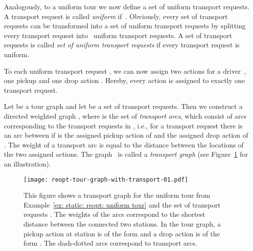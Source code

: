 \documentclass[english]{llncs}
\numberwithin{sublemma}{lemma}
\begin{document}
Analogously, to a uniform tour we now define a set of uniform transport requests.
A transport request  is called \emph{uniform} if~.
Obviously, every set of transport requests can be transformed into a set of uniform transport requests by splitting every transport request  into~ uniform transport requests.
A set of transport requests  is called \emph{set of uniform transport requests} if every transport request  is uniform.


To each uniform transport request , we can now assign two actions for a driver~, one pickup  and one drop action .
Hereby, every action is assigned to exactly one transport request.

Let  be a tour graph and let  be a set of transport requests.
Then we construct a directed weighted graph , where
 is the set of \emph{transport arcs}, which consist of arcs corresponding to the transport requests in ,
i.e., for a transport request  there is an arc between  if  is the assigned pickup action of  and  the assigned drop action of .
The weight of a transport arc is equal to the distance between the locations of the two assigned actions.
The graph~ is called a \emph{transport graph} (see Figure~\ref{fig: static: reopt: transport graph} for an illustration).


\begin{figure}[ht]
    \centering
    \texttt{[image: reopt-tour-graph-with-transport-01.pdf]}
 \caption{
  This figure shows a transport graph for the uniform tour  from Example~\ref{ex: static: reopt: uniform tour} and the set of transport requests
  .
  The weights of the arcs correspond to the shortest distance between the connected two stations.
  In the tour graph, a pickup action at station  is of the form  and a drop action is of the form .
  The dash-dotted arcs correspond to transport arcs.
 }
 \label{fig: static: reopt: transport graph}
\end{figure}
\end{document}
